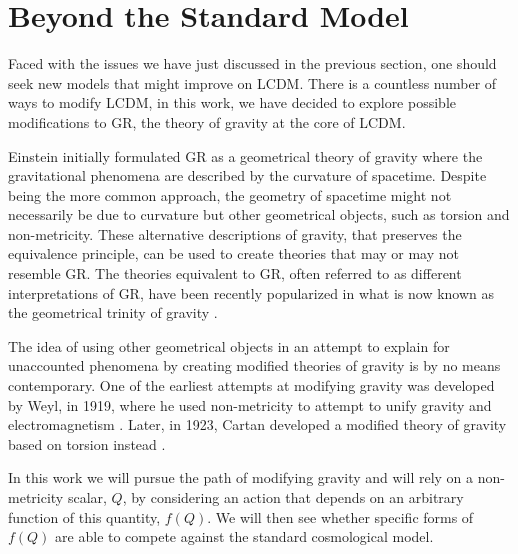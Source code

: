 \section{Beyond the Standard Model}
\label{sec:alternative-cosmological-models}

Faced with the issues we have just discussed in the previous section, one should seek new models that might improve on \gls{LCDM}. There is a countless number of ways to modify \gls{LCDM}, in this work, we have decided to explore possible modifications to \gls{GR}, the theory of gravity at the core of \gls{LCDM}.

Einstein initially formulated \gls{GR} as a geometrical theory of gravity where the gravitational phenomena are described by the curvature of spacetime. Despite being the more common approach, the geometry of spacetime might not necessarily be due to curvature but other geometrical objects, such as torsion and non-metricity. These alternative descriptions of gravity, that preserves the equivalence principle, can be used to create theories that may or may not resemble \gls{GR}. The theories equivalent to \gls{GR}, often referred to as different interpretations of \gls{GR}, have been recently popularized in what is now known as the geometrical trinity of gravity \cite{Jimenez2019}.

The idea of using other geometrical objects in an attempt to explain for unaccounted phenomena by creating modified theories of gravity is by no means contemporary. One of the earliest attempts at modifying gravity was developed by Weyl, in 1919, where he used non-metricity to attempt to unify gravity and electromagnetism \cite{Bergmann1976}. Later, in 1923, Cartan developed a modified theory of gravity based on torsion instead \cite{Tonnelat2014}.


In this work we will pursue the path of modifying gravity and will rely on a non-metricity scalar, $Q$, by considering an action that depends on an arbitrary function of this quantity, $f(Q)$. We will then see whether specific forms of $f(Q)$ are able to compete against the standard cosmological model.


